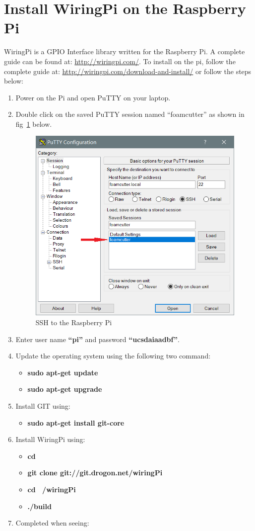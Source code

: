 \documentclass[titlepage,12pt,letter]{report}
\numberwithin{equation}{chapter}
\begin{document}
\section{Install WiringPi on the Raspberry Pi}
WiringPi is a GPIO Interface library written for the Raspberry Pi. A complete guide can be found at: \href{http://wiringpi.com/}{http://wiringpi.com/}. To install on the pi, follow the complete guide at: \href{http://wiringpi.com/download-and-install/}{http://wiringpi.com/download-and-install/} or follow the steps below:

\begin{enumerate}[itemsep = 5pt,topsep=0pt]
	\item Power on the Pi and open PuTTY on your laptop.
	\item Double click on the saved PuTTY session named ``foamcutter'' as shown in fig~\ref{fig:wiringpi} below.
	\begin{figure} [H]
	\includegraphics[width = 0.6\linewidth]{./Figures/Laptop_Setup/putty3.png}
	\caption{SSH to the Raspberry Pi}
	\label{fig:wiringpi}
	\end{figure}
	\item Enter user name \textbf{``pi''} and password \textbf{``ucsdaiaadbf''}.
	\item Update the operating system using the following two command:
	\begin{itemize}[noitemsep,topsep=0pt]
		\item \textbf{sudo apt-get update}
		\item \textbf{sudo apt-get upgrade}
	\end{itemize}
	\item Install GIT using:
	\begin{itemize}[noitemsep,topsep=0pt]
		\item \textbf{sudo apt-get install git-core}
	\end{itemize}
	\item Install WiringPi using:
	\begin{itemize}[noitemsep,topsep=0pt]
		\item \textbf{cd}
		\item \textbf{git clone git://git.drogon.net/wiringPi}
		\item \textbf{cd ~/wiringPi}
		\item \textbf{./build}
	\end{itemize}
	\item Completed when seeing: \\
	

\end{enumerate}
\end{document}
